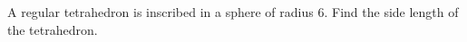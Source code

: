 A regular tetrahedron is inscribed in a sphere of radius $6$. Find the side length of the tetrahedron.
